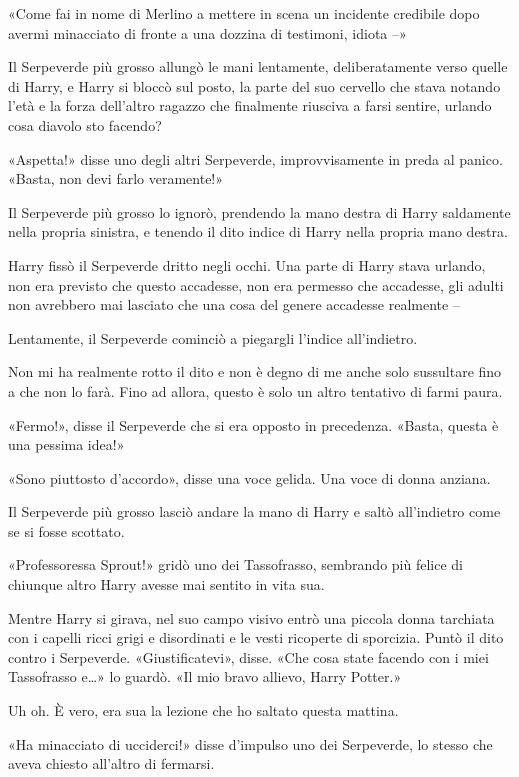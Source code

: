 «Come fai in nome di Merlino a mettere in scena un incidente credibile dopo avermi minacciato di fronte a una dozzina di testimoni, idiota –»

Il Serpeverde più grosso allungò le mani lentamente, deliberatamente verso quelle di Harry, e Harry si bloccò sul posto, la parte del suo cervello che stava notando l’età e la forza dell’altro ragazzo che finalmente riusciva a farsi sentire, urlando cosa diavolo sto facendo?

«Aspetta!» disse uno degli altri Serpeverde, improvvisamente in preda al panico. «Basta, non devi farlo veramente!»

Il Serpeverde più grosso lo ignorò, prendendo la mano destra di Harry saldamente nella propria sinistra, e tenendo il dito indice di Harry nella propria mano destra.

Harry fissò il Serpeverde dritto negli occhi. Una parte di Harry stava urlando, non era previsto che questo accadesse, non era permesso che accadesse, gli adulti non avrebbero mai lasciato che una cosa del genere accadesse realmente –

Lentamente, il Serpeverde cominciò a piegargli l’indice all’indietro.

Non mi ha realmente rotto il dito e non è degno di me anche solo sussultare fino a che non lo farà. Fino ad allora, questo è solo un altro tentativo di farmi paura.

«Fermo!», disse il Serpeverde che si era opposto in precedenza. «Basta, questa è una pessima idea!»

«Sono piuttosto d’accordo», disse una voce gelida. Una voce di donna anziana.

Il Serpeverde più grosso lasciò andare la mano di Harry e saltò all’indietro come se si fosse scottato.

«Professoressa Sprout!» gridò uno dei Tassofrasso, sembrando più felice di chiunque altro Harry avesse mai sentito in vita sua.

Mentre Harry si girava, nel suo campo visivo entrò una piccola donna tarchiata con i capelli ricci grigi e disordinati e le vesti ricoperte di sporcizia. Puntò il dito contro i Serpeverde. «Giustificatevi», disse. «Che cosa state facendo con i miei Tassofrasso e…» lo guardò. «Il mio bravo allievo, Harry Potter.»

Uh oh. È vero, era sua la lezione che ho saltato questa mattina.

«Ha minacciato di ucciderci!» disse d’impulso uno dei Serpeverde, lo stesso che aveva chiesto all’altro di fermarsi.

